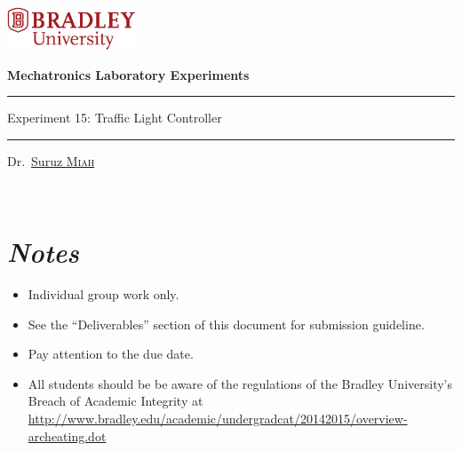 \documentclass{article}
\def\labTitle{Experiment 15: Traffic Light Controller}
\newcommand{\midskip}[0]{\vspace{3mm}}
\begin{document}
\centerline{\href{http://www.bradley.edu}{\includegraphics[height=0.5in]{figs/logoBU1-Print}}}

\begin{center}
\vspace*{1.0cm}
{\bf \LARGE %
  Mechatronics Laboratory Experiments}



\vspace*{2.0cm}

{\color{BrickRed}
\hrule height 1.5pt
\midskip
}
{\LARGE %
\labTitle%
}\\
\midskip
{\color{BrickRed}
\hrule height 1.5pt
\midskip
}
\vspace*{0.15cm}
\begin{flushright}
{\Large
Dr.~\href{http://personalpages.bradley.edu/~smiah}{Suruz \textsc{Miah}}
}
\end{flushright}

\vspace*{1.0cm}
\noindent
~\hfill{}


\end{center}

\vspace*{1.0cm}
\section*{\textit{Notes}}
\begin{itemize}
\item Individual group work only. 
  
\item See the ``Deliverables'' section of this document for submission guideline. 

\item Pay attention to the due date. %
\item All students should be be aware of the regulations of the Bradley University's Breach of Academic Integrity at \url{http://www.bradley.edu/academic/undergradcat/20142015/overview-archeating.dot}
\end{itemize}
\end{document}
